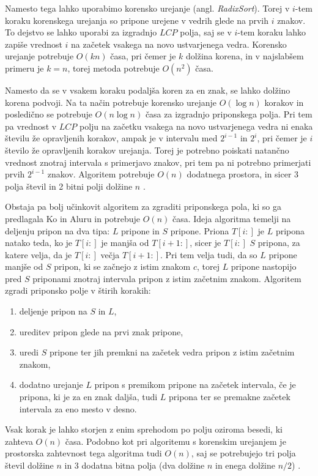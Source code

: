 Namesto tega lahko uporabimo korensko urejanje (angl. \textit{RadixSort}). Torej v $i$-tem koraku korenskega urejanja so pripone urejene v vedrih glede na prvih $i$ znakov. To dejstvo se lahko uporabi za izgradnjo $LCP$ polja, saj se v $i$-tem koraku lahko zapiše vrednost $i$ na začetek vsakega na novo ustvarjenega vedra. Korensko urejanje potrebuje $O(kn)$ časa, pri čemer je $k$ dolžina korena, in v najslabšem primeru je $k=n$, torej metoda potrebuje $O(n^2)$ časa.

Namesto da se v vsakem koraku podaljša koren za en znak, se lahko dolžino korena podvoji. Na ta način potrebuje korensko urejanje $O(\log{n})$ korakov in posledično se potrebuje $O(n\log{n})$ časa za izgradnjo priponskega polja. Pri tem pa vrednost v $LCP$ polju na začetku vsakega na novo ustvarjenega vedra ni enaka številu že opravljenih korakov, ampak je v intervalu med $2^{i-1}$ in $2^{i}$, pri čemer je $i$ število že opravljenih korakov urejanja. Torej je potrebno poiskati natančno vrednost znotraj intervala s primerjavo znakov, pri tem pa ni potrebno primerjati prvih $2^{i-1}$ znakov. Algoritem potrebuje $O(n)$ dodatnega prostora, in sicer 3 polja števil in 2 bitni polji dolžine $n$ \cite{Manber1990}.


Obstaja pa bolj učinkovit algoritem za zgraditi priponskega pola, ki so ga predlagala Ko in Aluru \cite{Ko2005} in potrebuje $O(n)$ časa. Ideja algoritma temelji na deljenju pripon na dva tipa: $L$ pripone in $S$ pripone. Priona $T[i:]$ je $L$ pripona natako teda, ko je  $T[i:]$ je manjša od $T[i+1:]$, sicer je $T[i:]$ $S$ pripona, za katere velja, da je $T[i:]$ večja $T[i+1:]$. Pri tem velja tudi, da so $L$ pripone manjše od $S$ pripon, ki se začnejo z istim znakom $c$, torej $L$ pripone nastopijo pred $S$ priponami znotraj intervala pripon z istim začetnim znakom. Algoritem zgradi priponsko polje v štirih korakih:
\begin{enumerate}
    \item deljenje pripon na $S$ in $L$,
    \item ureditev pripon glede na prvi znak pripone,
    \item uredi $S$ pripone ter jih premkni na začetek vedra pripon z istim začetnim znakom,
    \item dodatno urejanje $L$ pripon s premikom pripone na začetek intervala, če je pripona, ki je za en znak daljša, tudi $L$ pripona ter se premakne začetek intervala za eno mesto v desno.
\end{enumerate}
Vsak korak je lahko storjen z enim sprehodom po polju oziroma besedi, ki zahteva $O(n)$ časa. Podobno kot pri algoritemu s korenskim urejanjem je prostorska zahtevnost tega algoritma tudi $O(n)$, saj se potrebujejo tri polja števil dolžine $n$ in 3 dodatna bitna polja (dva dolžine $n$ in enega dolžine $n/2$) \cite{Ko2005}.